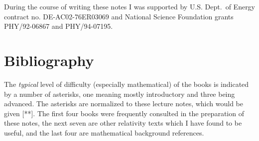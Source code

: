 During the course of writing these notes I was supported by
U.S. Dept.~of Energy contract no. DE-AC02-76ER03069 and National
Science Foundation grants PHY/92-06867 and PHY/94-07195.

\eject

\section*{Bibliography}

\noindent
The {\it typical} level of difficulty (especially mathematical) of the books
is indicated by a number of asterisks, one meaning mostly introductory
and three being advanced.  The asterisks are
normalized to these lecture notes, which would be given [**].  The 
first four books were frequently consulted in the preparation of these
notes, the next seven are other relativity texts which I have found
to be useful, and the last four are mathematical background references.

